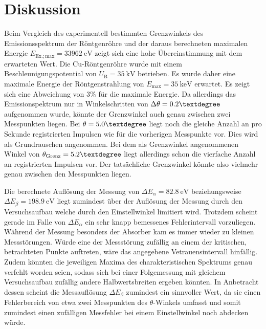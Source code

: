 \section{Diskussion}
\label{sec:Diskussion}

Beim Vergleich des experimentell bestimmten Grenzwinkels des Emissionsspektrum der Röntgenröhre und der daraus berechneten maximalen Energie $E_\mathrm{Ex.;max}=\SI{33962}{\electronvolt}$ zeigt sich eine hohe Übereinstimmung mit dem erwarteten Wert.
Die Cu-Röntgenröhre wurde mit einem Beschleunigungspotential von $U_\mathrm{B}=\SI{35}{\kilo\volt}$ betrieben. Es wurde daher eine maximale Energie der Röntgenstrahlung von $E_\mathrm{max}=\SI{35}{\kilo\electronvolt}$ erwartet.
Es zeigt sich eine Abweichung von $3\%$ für die maximale Energie.
Da allerdings das Emissionspektrum nur in Winkelschritten von $\Delta \theta=0.2\textdegree$ aufgenommen wurde, könnte der Grenzwinkel auch genau zwischen zwei Messpunkten liegen. Bei $\theta=5.0\textdegree$ liegt noch die gleiche Anzahl an pro Sekunde registrierten Impulsen wie für die vorherigen Messpunkte vor. Dies wird als Grundrauschen angenommen.
Bei dem als Grenzwinkel angenommenen Winkel von $\theta_\mathrm{Grenz}=5.2\textdegree$ liegt allerdings schon die vierfache Anzahl an registrierten Impulsen vor. Der tatsächliche Grenzwinkel könnte also vielmehr genau zwischen den Messpunkten liegen.

Die berechnete Auflösung der Messung von $\Delta E_{\alpha}=\SI{82.8}{\electronvolt}$
beziehungsweise $\Delta E_{\beta}=\SI{198.9}{\electronvolt}$ liegt zumindest über der Auflösung der Messung durch den Versuchsaufbau welche durch den Einstellwinkel limitiert wird.
Trotzdem scheint gerade im Falle von $\Delta E_\alpha$ ein sehr knapp bemessenes Fehlerintervall vorzuliegen.
Während der Messung besonders der Absorber kam es immer wieder zu kleinen Messstörungen. Würde eine der Messstörung zufällig an einem der kritischen, betrachteten Punkte auftreten, wäre das angegebene Vetrauensintervall hinfällig. Zudem könnten die jeweiligen Maxima des charakteristischen Spektrums genau verfehlt worden seien, sodass sich bei einer Folgemessung mit gleichem Versuchsaufbau zufällig andere Halbwertsbreiten ergeben könnten.
In Anbetracht dessen scheint die Messauflösung $\Delta E_{\beta}$ zumindest ein sinnvoller Wert, da sie einen Fehlerbereich von etwa zwei Messpunkten des $\theta$-Winkels umfasst und somit zumindest einen zufälligen Messfehler bei einem Einstellwinkel noch abdecken würde.
